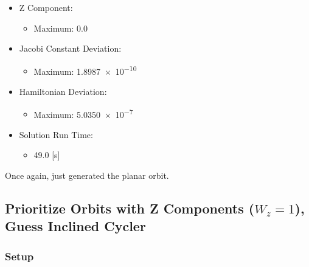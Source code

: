 \documentclass{article}
\begin{document}
\begin{itemize}
    \item Z Component:
    \begin{itemize}
        \item Maximum: 0.0
    \end{itemize}
    \item Jacobi Constant Deviation:
    \begin{itemize}
        \item Maximum: \num{1.8987e-10}
    \end{itemize}
    \item Hamiltonian Deviation:
    \begin{itemize}
        \item Maximum: \num{5.0350e-7}
    \end{itemize}
    \item Solution Run Time:
    \begin{itemize}
        \item 49.0 [s]
    \end{itemize}  
\end{itemize}

Once again, just generated the planar orbit.

\newpage

\subsection{Prioritize Orbits with Z Components ($W_z = 1$), Guess Inclined Cycler}

\subsubsection{Setup}
\end{document}
